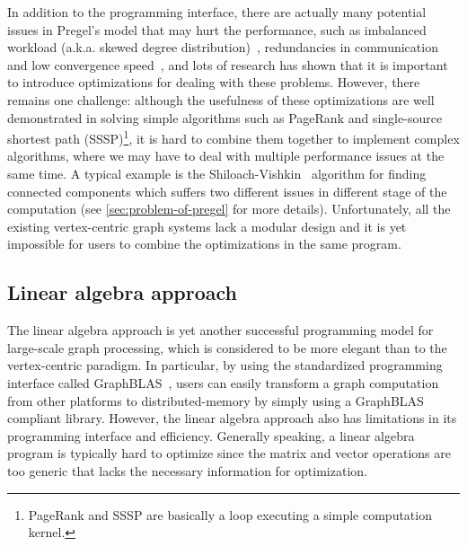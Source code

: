\documentclass{sokendai_thesis} %
\begin{document}
In addition to the programming interface, there are actually many potential issues in Pregel's model that may hurt the performance, such as imbalanced workload (a.k.a. skewed degree distribution)~\cite{powergraph,yan2015effective,yan2014pregel}, redundancies in communication~\cite{gps,xpregel,yan2015effective} and low convergence speed~\cite{thinkgraph,goffish,yan2014blogel}, and lots of research has shown that it is important to introduce optimizations for dealing with these problems. 
However, there remains one challenge: although the usefulness of these optimizations are well demonstrated in solving simple algorithms such as PageRank and single-source shortest path (SSSP)\footnote{\small PageRank and SSSP are basically a loop executing a simple computation kernel.}, it is hard to combine them together to implement complex algorithms, where we may have to deal with multiple performance issues at the same time.
A typical example is the Shiloach-Vishkin~\cite{ShVi82} algorithm for finding connected components which suffers two different issues in different stage of the computation (see \autoref{sec:problem-of-pregel} for more details).
Unfortunately, all the existing vertex-centric graph systems lack a modular design and it is yet impossible for users to combine the optimizations in the same program.


\subsection{Linear algebra approach}
\label{sec:limitation-la}


The linear algebra approach is yet another successful programming model for large-scale graph processing, which is considered to be more elegant than to the vertex-centric paradigm.
In particular, by using the standardized programming interface called GraphBLAS~\cite{graphblas}, users can easily transform a graph computation from other platforms to distributed-memory by simply using a GraphBLAS compliant library.
However, the linear algebra approach also has limitations in its programming interface and efficiency.
Generally speaking, a linear algebra program is typically hard to optimize since the matrix and vector operations are too generic that lacks the necessary information for optimization.
\end{document}
